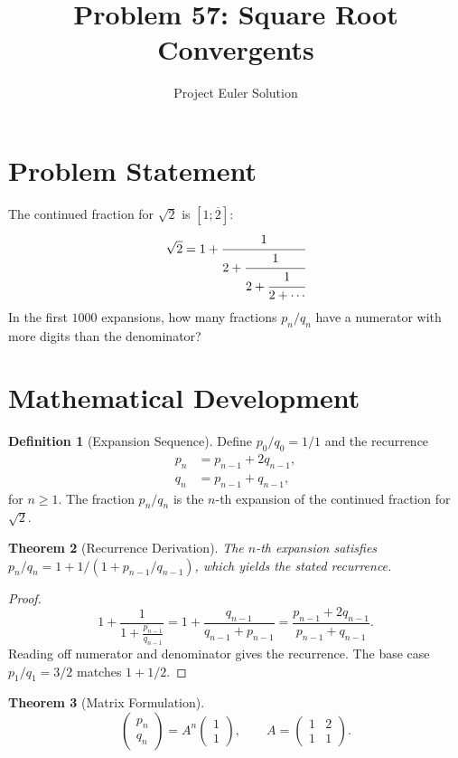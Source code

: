 \documentclass[12pt,a4paper]{article}
\title{Problem 57: Square Root Convergents}
\author{Project Euler Solution}
\date{}
\newtheorem{theorem}{Theorem}
\theoremstyle{definition}
\newtheorem{definition}[theorem]{Definition}
\theoremstyle{remark}
\begin{document}
\maketitle

\section{Problem Statement}
The continued fraction for $\sqrt{2}$ is $[1; \overline{2}]$:
\[
\sqrt{2} = 1 + \cfrac{1}{2 + \cfrac{1}{2 + \cfrac{1}{2 + \cdots}}}
\]
In the first $1000$ expansions, how many fractions $p_n/q_n$ have a numerator with more digits than the denominator?

\section{Mathematical Development}

\begin{definition}[Expansion Sequence]
Define $p_0/q_0 = 1/1$ and the recurrence
\begin{align}
p_n &= p_{n-1} + 2q_{n-1}, \\
q_n &= p_{n-1} + q_{n-1},
\end{align}
for $n \geq 1$. The fraction $p_n/q_n$ is the $n$-th expansion of the continued fraction for $\sqrt{2}$.
\end{definition}

\begin{theorem}[Recurrence Derivation]
The $n$-th expansion satisfies $p_n/q_n = 1 + 1/(1 + p_{n-1}/q_{n-1})$, which yields the stated recurrence.
\end{theorem}

\begin{proof}
\[
1 + \frac{1}{1 + \frac{p_{n-1}}{q_{n-1}}} = 1 + \frac{q_{n-1}}{q_{n-1} + p_{n-1}} = \frac{p_{n-1} + 2q_{n-1}}{p_{n-1} + q_{n-1}}.
\]
Reading off numerator and denominator gives the recurrence. The base case $p_1/q_1 = 3/2$ matches $1 + 1/2$.
\end{proof}

\begin{theorem}[Matrix Formulation]
\[
\begin{pmatrix} p_n \\ q_n \end{pmatrix}
= A^n \begin{pmatrix} 1 \\ 1 \end{pmatrix}, \qquad
A = \begin{pmatrix} 1 & 2 \\ 1 & 1 \end{pmatrix}.
\]
\end{theorem}
\end{document}
